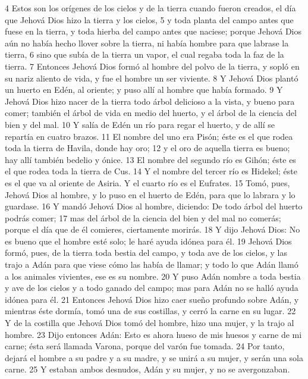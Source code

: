 4 Estos son los orígenes de los cielos y de la tierra cuando fueron creados, el día que Jehová Dios hizo la tierra y los cielos,
5 y toda planta del campo antes que fuese en la tierra, y toda hierba del campo antes que naciese; porque Jehová Dios aún no había hecho llover sobre la tierra, ni había hombre para que labrase la tierra,
6 sino que subía de la tierra un vapor, el cual regaba toda la faz de la tierra.
7 Entonces Jehová Dios formó al hombre del polvo de la tierra, y sopló en su nariz aliento de vida, y fue el hombre un ser viviente.
8 Y Jehová Dios plantó un huerto en Edén, al oriente; y puso allí al hombre que había formado.
9 Y Jehová Dios hizo nacer de la tierra todo árbol delicioso a la vista, y bueno para comer; también el árbol de vida en medio del huerto, y el árbol de la ciencia del bien y del mal.
10 Y salía de Edén un río para regar el huerto, y de allí se repartía en cuatro brazos.
11 El nombre del uno era Pisón; éste es el que rodea toda la tierra de Havila, donde hay oro;
12 y el oro de aquella tierra es bueno; hay allí también bedelio y ónice.
13 El nombre del segundo río es Gihón; éste es el que rodea toda la tierra de Cus.
14 Y el nombre del tercer río es Hidekel; éste es el que va al oriente de Asiria. Y el cuarto río es el Eufrates.
15 Tomó, pues, Jehová Dios al hombre, y lo puso en el huerto de Edén, para que lo labrara y lo guardase.
16 Y mandó Jehová Dios al hombre, diciendo: De todo árbol del huerto podrás comer;
17 mas del árbol de la ciencia del bien y del mal no comerás; porque el día que de él comieres, ciertamente morirás.
18 Y dijo Jehová Dios: No es bueno que el hombre esté solo; le haré ayuda idónea para él.
19 Jehová Dios formó, pues, de la tierra toda bestia del campo, y toda ave de los cielos, y las trajo a Adán para que viese cómo las había de llamar; y todo lo que Adán llamó a los animales vivientes, ese es su nombre.
20 Y puso Adán nombre a toda bestia y ave de los cielos y a todo ganado del campo; mas para Adán no se halló ayuda idónea para él.
21 Entonces Jehová Dios hizo caer sueño profundo sobre Adán, y mientras éste dormía, tomó una de sus costillas, y cerró la carne en su lugar.
22 Y de la costilla que Jehová Dios tomó del hombre, hizo una mujer, y la trajo al hombre.
23 Dijo entonces Adán: Esto es ahora hueso de mis huesos y carne de mi carne; ésta será llamada Varona, porque del varón fue tomada.
24 Por tanto, dejará el hombre a su padre y a su madre, y se unirá a su mujer, y serán una sola carne.
25 Y estaban ambos desnudos, Adán y su mujer, y no se avergonzaban.

